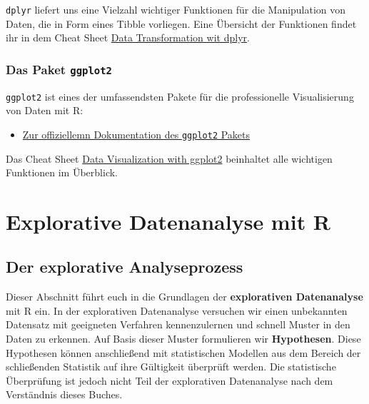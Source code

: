 \documentclass[
]{book}
\providecommand{\tightlist}{%
  \setlength{\itemsep}{0pt}\setlength{\parskip}{0pt}}
\begin{document}
\texttt{dplyr} liefert uns eine Vielzahl wichtiger Funktionen für die Manipulation von Daten, die in Form eines Tibble vorliegen. Eine Übersicht der Funktionen findet ihr in dem Cheat Sheet \href{https://raw.githubusercontent.com/rstudio/cheatsheets/main/data-transformation.pdf}{Data Transformation wit dplyr}.

\hypertarget{das-paket-ggplot2}{%
\section{\texorpdfstring{Das Paket \texttt{ggplot2}}{Das Paket ggplot2}}\label{das-paket-ggplot2}}

\texttt{ggplot2} ist eines der umfassendsten Pakete für die professionelle Visualisierung von Daten mit R:

\begin{itemize}
\tightlist
\item
  \href{https://ggplot2.tidyverse.org/}{Zur offiziellemn Dokumentation des \texttt{ggplot2} Pakets}
\end{itemize}

Das Cheat Sheet \href{https://raw.githubusercontent.com/rstudio/cheatsheets/main/data-visualization.pdf}{Data Visualization with ggplot2} beinhaltet alle wichtigen Funktionen im Überblick.

\hypertarget{part-explorative-datenanalyse-mit-r}{%
\part*{Explorative Datenanalyse mit R}\label{part-explorative-datenanalyse-mit-r}}

\hypertarget{der-explorative-analyseprozess}{%
\chapter{Der explorative Analyseprozess}\label{der-explorative-analyseprozess}}

Dieser Abschnitt führt euch in die Grundlagen der \textbf{explorativen Datenanalyse} mit R ein. In der explorativen Datenanalyse versuchen wir einen unbekannten Datensatz mit geeigneten Verfahren kennenzulernen und schnell Muster in den Daten zu erkennen. Auf Basis dieser Muster formulieren wir \textbf{Hypothesen}. Diese Hypothesen können anschließend mit statistischen Modellen aus dem Bereich der schließenden Statistik auf ihre Gültigkeit überprüft werden. Die statistische Überprüfung ist jedoch nicht Teil der explorativen Datenanalyse nach dem Verständnis dieses Buches.
\end{document}
